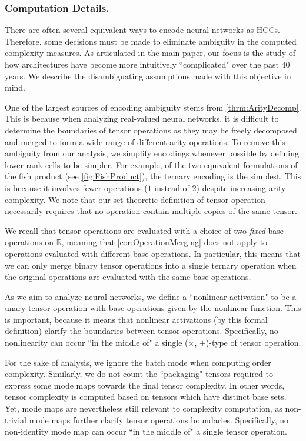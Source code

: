 \documentclass{article}
\theoremstyle{plain}
\theoremstyle{definition}
\theoremstyle{remark}
\begin{document}
\subsubsection{Computation Details.\label{sec:Disambig}}
There are often several equivalent ways to encode neural networks as HCCs. Therefore, some decisions must be made to eliminate ambiguity in the computed complexity measures. As articulated in the main paper, our focus is the study of how architectures have become more intuitively ``complicated" over the past $40$ years. We describe the disambiguating assumptions made with this objective in mind.

One of the largest sources of encoding ambiguity stems from \cref{thrm:ArityDecomp}. This is because when analyzing real-valued neural networks, it is difficult to determine the boundaries of tensor operations as they may be freely decomposed and merged to form a wide range of different arity operations. To remove this ambiguity from our analysis, we simplify encodings whenever possible by defining lower rank cells to be simpler. For example, of the two equivalent formulations of the fish product (see \cref{fig:FishProduct}), the ternary encoding is the simplest. This is because it involves fewer operations ($1$ instead of $2$) despite increasing arity complexity. We note that our set-theoretic definition of tensor operation necessarily requires that no operation contain multiple copies of the same tensor. 

We recall that tensor operations are evaluated with a choice of two \textit{fixed} base operations on $\mathbb{R}$, meaning that \cref{cor:OperationMerging} does not apply to operations evaluated with different base operations. In particular, this means that we can only merge binary tensor operations into a single ternary operation when the original operations are evaluated with the same base operations.

As we aim to analyze neural networks, we define a ``nonlinear activation" to be a unary tensor operation with base operations given by the nonlinear function. This is important, because it means that nonlinear activations (by this formal definition) clarify the boundaries between tensor operations. Specifically, no nonlinearity can occur ``in the middle of" a single ($\times$, $+$)-type of tensor operation.

For the sake of analysis, we ignore the batch mode when computing order complexity. Similarly, we do not count the ``packaging" tensors required to express some mode maps towards the final tensor complexity. In other words, tensor complexity is computed based on tensors which have distinct base sets. Yet, mode maps are nevertheless still relevant to complexity computation, as non-trivial mode maps further clarify tensor operations boundaries. Specifically, no non-identity mode map can occur ``in the middle of" a single tensor operation.
\end{document}
